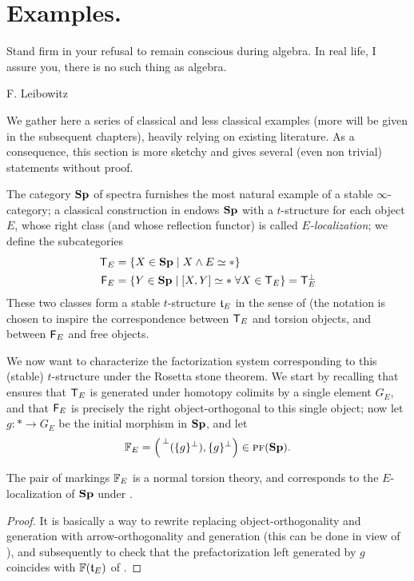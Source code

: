 \section{Examples.}\label{sec:examples}
\epigraph{Stand firm in your refusal to remain conscious during algebra. In real life, I assure you, there is no such thing as algebra.}{F\@. Leibowitz}
We gather here a series of classical and less classical examples (more will be given in the subsequent chapters), heavily relying on existing literature. As a consequence, this section is more sketchy and gives several (even non trivial) statements without proof.
\begin{example}
The category $\sp$ of spectra furnishes the most natural example of a stable $\infty$\hyp{}category; a classical construction in \cite{bousfield1979localization} endows $\sp$ with a $t$\hyp{}structure for each object $E$, whose right class (and whose reflection functor) is called \emph{$E$\hyp{}localization}; we define the subcategories
\begin{align}
\mcal{T}_E &= \{X\in\sp\mid X\land E\simeq *\}\\
\mcal{F}_E &= \{Y \in\sp\mid [X,Y]\simeq * \; \forall X \in \mcal{T}_E\} = \mcal{T}_E^\perp
\end{align}
These two classes form a stable $t$\hyp{}structure $\tee_E$ in the sense of  (the notation is chosen to inspire the correspondence between $\mcal{T}_E$ and torsion objects, and between $\mcal{F}_E$ and free objects.

We now want to characterize the factorization system corresponding to this (stable) $t$\hyp{}structure under the Rosetta stone theorem. We start by recalling that \cite[Lemma \textbf{1.13}]{bousfield1979localization} ensures that $\mcal{T}_E$ is generated under homotopy colimits by a single element $G_E$, and that $\F_E$ is precisely the right object\hyp{}orthogonal to this single object; now let $g\colon * \to G_E$ be the initial morphism in $\sp$, and let
\[
\fF_E = \Big( \prescript{\perp}{}{(\{g\}^\perp)}, \{g\}^\perp \Big) \in \pf(\sp).
\]
\begin{theorem}
The pair of markings $\fF_E$ is a normal torsion theory, and corresponds to the $E$\hyp{}localization of $\sp$ under \athm {}.
\end{theorem}
\begin{proof}
It is basically a way to rewrite \cite[\textbf{1.13}, \textbf{1.14}]{bousfield1979localization} replacing object\hyp{}orthogonality and generation with arrow\hyp{}orthogonality and generation (this can be done in view of ), and subsequently to check that the prefactorization left generated by $g$ coincides with $\fF(\tee_E)$ of \adef {}.
\end{proof}
\end{example}
